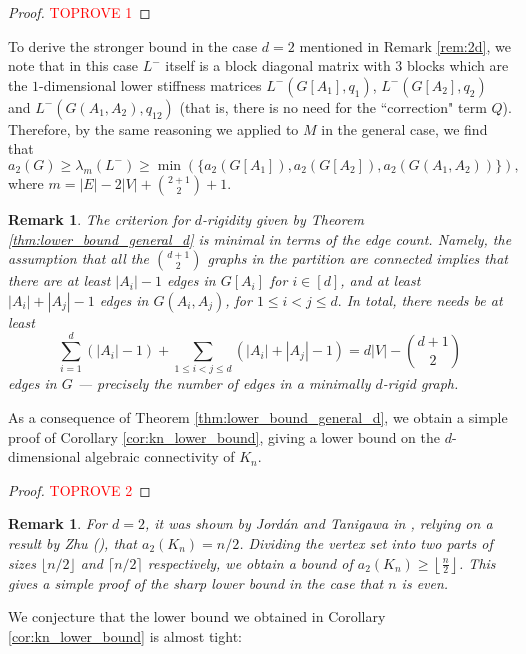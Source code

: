 \documentclass[a4paper,11pt]{article}
\theoremstyle{plain}
\newtheorem{remark}[theorem]{\bf Remark}
\theoremstyle{definition}
\newcommand{\lfrac}[2]{\left\lfloor\frac{#1}{#2}\right\rfloor}
\begin{document}
\begin{proof}\textcolor{red}{TOPROVE 1}\end{proof}

To derive the stronger bound in the case $d=2$ mentioned in Remark \ref{rem:2d}, we note that in this case $L^-$ itself is a block diagonal matrix with $3$ blocks which are the $1$-dimensional lower stiffness matrices $L^-(G[A_1],q_1)$, $L^-(G[A_2],q_2)$ and $L^-(G(A_1,A_2),q_{12})$ (that is, there is no need for the ``correction" term $Q$). Therefore, by the same reasoning we applied to $M$ in the general case, we find that
\[
a_2(G)\ge \lambda_{m}(L^-) \ge \min(\{a_2(G[A_1]),a_2(G[A_2]),a_2(G(A_1,A_2))\}),
\]
where $m=|E|-2|V|+\binom{2+1}{2}+1$.

\begin{remark}
    The criterion for $d$-rigidity given by Theorem \ref{thm:lower_bound_general_d} is minimal in terms of the edge count. Namely, the assumption that all the $\binom {d+1}2$ graphs in the partition are connected implies that there are at least $|A_i|-1$ edges in $G[A_i]$ for $i\in [d]$, and at least $|A_i|+|A_j|-1$ edges in $G(A_i,A_j)$, for  $1\le i<j\le d.$ In total, there needs be at least
    \[
    \sum_{i=1}^{d}(|A_i|-1) + \sum_{1\le i<j\le d}(|A_i|+|A_j|-1) = d|V|-\binom{d+1}{2}
    \]
    edges in $G$ --- precisely the number of edges in a minimally $d$-rigid graph.
\end{remark}



As a consequence of Theorem \ref{thm:lower_bound_general_d}, we obtain a simple proof of Corollary \ref{cor:kn_lower_bound}, giving a lower bound on the $d$-dimensional algebraic connectivity of $K_n$.

\begin{proof}\textcolor{red}{TOPROVE 2}\end{proof}

\begin{remark}
For $d=2$, it was shown by Jord\'an and Tanigawa in \cite{jordan2022rigidity}, relying on a result by Zhu (\cite{zhu2013quantitative}), that $a_2(K_n)=n/2$. Dividing the vertex set into two parts of sizes $\lfloor n/2 \rfloor$ and $\lceil n/2 \rceil$ respectively, we obtain a bound of $a_2(K_n)\geq \lfrac{n}{2}$. This gives a simple proof of the sharp lower bound in the case that $n$ is even.
\end{remark}

We conjecture that the lower bound we obtained in Corollary \ref{cor:kn_lower_bound} is almost tight:
\end{document}
